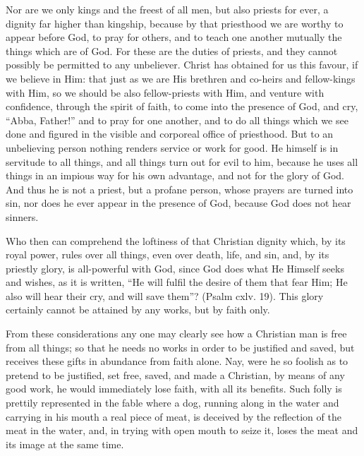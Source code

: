 Nor are we only kings and the freest of all men, but also priests for
ever, a dignity far higher than kingship, because by that priesthood we
are worthy to appear before God, to pray for others, and to teach one
another mutually the things which are of God. For these are the duties of
priests, and they cannot possibly be permitted to any unbeliever. Christ
has obtained for us this favour, if we believe in Him: that just as we are
His brethren and co-heirs and fellow-kings with Him, so we should be also
fellow-priests with Him, and venture with confidence, through the spirit
of faith, to come into the presence of God, and cry, ``Abba, Father!'' and
to pray for one another, and to do all things which we see done and
figured in the visible and corporeal office of priesthood. But to an
unbelieving person nothing renders service or work for good. He himself is
in servitude to all things, and all things turn out for evil to him,
because he uses all things in an impious way for his own advantage, and
not for the glory of God. And thus he is not a priest, but a profane
person, whose prayers are turned into sin, nor does he ever appear in the
presence of God, because God does not hear sinners.

Who then can comprehend the loftiness of that Christian dignity which, by
its royal power, rules over all things, even over death, life, and sin,
and, by its priestly glory, is all-powerful with God, since God does what
He Himself seeks and wishes, as it is written, ``He will fulfil the desire
of them that fear Him; He also will hear their cry, and will save them''?
(Psalm cxlv. 19). This glory certainly cannot be attained by any works,
but by faith only.

From these considerations any one may clearly see how a Christian man is
free from all things; so that he needs no works in order to be justified
and saved, but receives these gifts in abundance from faith alone. Nay,
were he so foolish as to pretend to be justified, set free, saved, and
made a Christian, by means of any good work, he would immediately lose
faith, with all its benefits. Such folly is prettily represented in the
fable where a dog, running along in the water and carrying in his mouth a
real piece of meat, is deceived by the reflection of the meat in the
water, and, in trying with open mouth to seize it, loses the meat and its
image at the same time.

